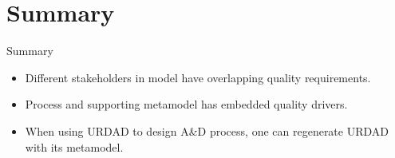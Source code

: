 \documentclass[a4]{article}
\begin{document}
\section{Summary}

\begin{frame}{Summary}
 \begin{itemize}
  \item<+-| alert@+> Different stakeholders in model have overlapping quality requirements.
  \item<+-| alert@+> Process and supporting metamodel has embedded quality drivers.
  \item<+-| alert@+> When using URDAD to design A\&D process, one can regenerate URDAD with its metamodel.
 \end{itemize}
\end{frame}
\end{document}
